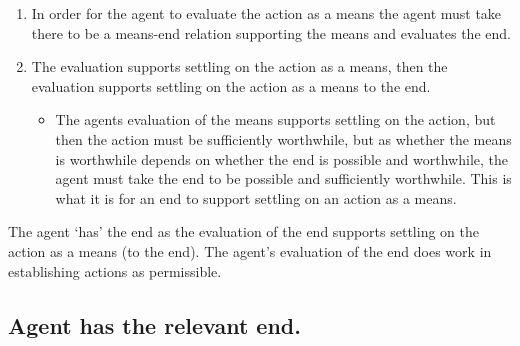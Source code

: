 \documentclass[10pt]{article}
\newcommand{\hozlinedash}[0]{%
  \noindent\hdashrule[0.5ex][c]{\textwidth}{.1pt}{2.5pt}
}
\begin{document}
\begin{enumerate}[label=\alph*., ref=(\alph*)]
\item In order for the agent to evaluate the action as a means the agent must take there to be a means-end relation supporting the means and evaluates the end.
\item The evaluation supports settling on the action as a means, then the evaluation supports settling on the action as a means to the end.
  \begin{itemize}
  \item The agents evaluation of the means supports settling on the action, but then the action must be sufficiently worthwhile, but as whether the means is worthwhile depends on whether the end is possible and worthwhile, the agent must take the end to be possible and sufficiently worthwhile.
    This is what it is for an end to support settling on an action as a means.
  \end{itemize}
\end{enumerate}


The agent `has' the end as the evaluation of the end supports settling on the action as a means (to the end).
The agent's evaluation of the end does work in establishing actions as permissible.

\newpage


\subsection{Agent has the relevant end.}
\label{sec:posessed-end}

\hozlinedash
\end{document}
